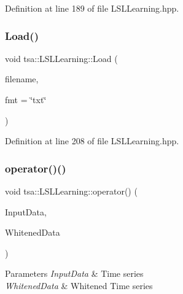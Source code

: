 Definition at line 189 of file L\+S\+L\+Learning.\+hpp.

\mbox{\label{classtsa_1_1_l_s_l_learning_a0faa13eb2f31988b73c4740c3e1c4085}} 
\subsubsection{\texorpdfstring{Load()}{Load()}}
{\footnotesize\ttfamily void tsa\+::\+L\+S\+L\+Learning\+::\+Load (\begin{DoxyParamCaption}\item[{const char $\ast$}]{filename,  }\item[{const char $\ast$}]{fmt = {\ttfamily \char`\"{}txt\char`\"{}} }\end{DoxyParamCaption})\hspace{0.3cm}{\ttfamily [inline]}}



Definition at line 208 of file L\+S\+L\+Learning.\+hpp.

\mbox{\label{classtsa_1_1_l_s_l_learning_ac703af8aec35bece47d8b5dd5da96125}} 
\subsubsection{\texorpdfstring{operator()()}{operator()()}\hspace{0.1cm}{\footnotesize\ttfamily [1/3]}}
{\footnotesize\ttfamily void tsa\+::\+L\+S\+L\+Learning\+::operator() (\begin{DoxyParamCaption}\item[{\hyperlink{namespacetsa_ac599574bcc094eda25613724b8f3ca9e}{Seq\+View\+Double} \&}]{Input\+Data,  }\item[{\hyperlink{namespacetsa_ac599574bcc094eda25613724b8f3ca9e}{Seq\+View\+Double} \&}]{Whitened\+Data }\end{DoxyParamCaption})}


\begin{DoxyParams}{Parameters}
{\em Input\+Data} & Time series \\
\hline
{\em Whitened\+Data} & Whitened Time series \\
\hline
\end{DoxyParams}


